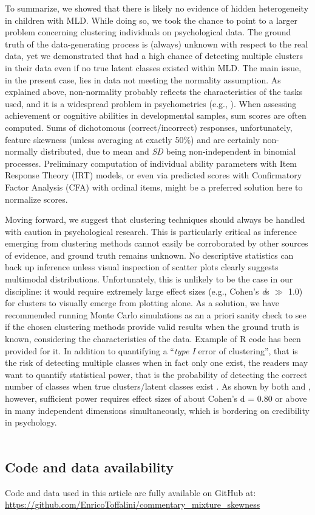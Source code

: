 \documentclass[letterpaper,11pt]{article}
\begin{document}
To summarize, we showed that there is likely no evidence of hidden heterogeneity in children with MLD. While doing so, we took the chance to point to a larger problem concerning clustering individuals on psychological data. The ground truth of the data-generating process is (always) unknown with respect to the real data, yet we demonstrated that  had a high chance of detecting multiple clusters in their data even if no true latent classes existed within MLD. The main issue, in the present case, lies in data not meeting the normality assumption. As explained above, non-normality probably reflects the characteristics of the tasks used, and it is a widespread problem in psychometrics (e.g., ). When assessing achievement or cognitive abilities in developmental samples, sum scores are often computed. Sums of dichotomous (correct/incorrect) responses, unfortunately, feature skewness (unless averaging at exactly 50\%) and are certainly non-normally distributed, due to mean and \textit{SD} being non-independent in binomial processes. Preliminary computation of individual ability parameters with Item Response Theory (IRT) models, or even via predicted scores with Confirmatory Factor Analysis (CFA) with ordinal items, might be a preferred solution here to normalize scores.

Moving forward, we suggest that clustering techniques should always be handled with caution in psychological research. This is particularly critical as inference emerging from clustering methods cannot easily be corroborated by other sources of evidence, and ground truth remains unknown. No descriptive statistics can back up inference unless visual inspection of scatter plots clearly suggests multimodal distributions. Unfortunately, this is unlikely to be the case in our discipline: it would require extremely large effect sizes (e.g., Cohen’s \textit{d}s $\gg$ 1.0) for clusters to visually emerge from plotting alone. As a solution, we have recommended running Monte Carlo simulations as an a priori sanity check to see if the chosen clustering methods provide valid results when the ground truth is known, considering the characteristics of the data. Example of R code has been provided for it. In addition to quantifying a “\textit{type I} error of clustering”, that is the risk of detecting multiple classes when in fact only one exist, the readers may want to quantify statistical power, that is the probability of detecting the correct number of classes when true clusters/latent classes exist \cite{tein2013statistical}. As shown by both  and , however, sufficient power requires effect sizes of about Cohen’s d = 0.80 or above in many independent dimensions simultaneously, which is bordering on credibility in psychology.
\\
\\
\subsection*{Code and data availability }
Code and data used in this article are fully available on GitHub at: \url{https://github.com/EnricoToffalini/commentary_mixture_skewness}


\end{document}

